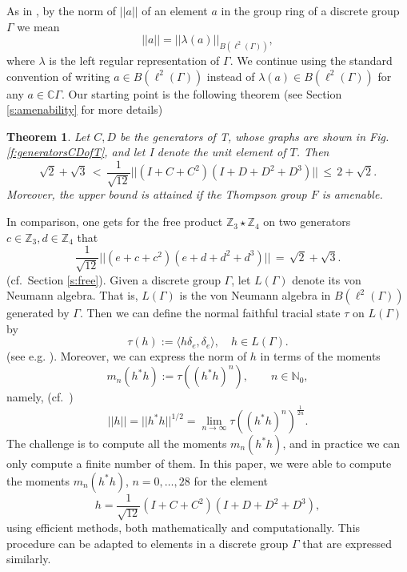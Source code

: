 \documentclass{amsart}
\newcommand{\C}{\mathbb C}
\newcommand{\N}{\mathbb N}
\newcommand{\Z}{\mathbb Z}
\newtheorem{thm}{Theorem}[section]
\theoremstyle{definition}
\begin{document}
As in \cite[Section 2]{HaagerupRamirezSolano},  by the norm of $||a||$  of an element $a$ in the group ring of a discrete group $\Gamma$ we mean
$$||a||=||\lambda(a)||_{B(\ell^2(\Gamma))},$$
where $\lambda$ is the left regular representation of $\Gamma$. We continue using the standard convention of writing  $a\in B(\ell^2(\Gamma))$ instead of $\lambda(a)\in B(\ell^2(\Gamma))$ for any $a\in \C \Gamma$.
Our starting point is the following theorem (see Section \ref{s:amenability} for more details) 
\begin{thm}Let $C,D$ be the generators of T, whose graphs are shown in Fig. \ref{f:generatorsCDofT}, and let I denote the unit element of $T$.  Then
$$\sqrt2+\sqrt3\,<\,\frac1{\sqrt{12}}||(I+C+C^2)(I+D+D^2+D^3)||\,\le\, 2+\sqrt2.$$
Moreover, the upper bound is attained if the Thompson group $F$ is amenable.
\end{thm}
In comparison, one gets for the free product $\Z_3\star\Z_4$ on two generators $c\in\Z_3, d\in\Z_4$ that
\begin{equation}\label{e:hfree}
\frac1{\sqrt{12}}||(e+c+c^2)(e+d+d^2+d^3)||\,=\,\sqrt2+\sqrt3.
\end{equation} 
(cf.~Section \ref{s:free}).
Given a discrete group $\Gamma$, let $L(\Gamma)$ denote its  von Neumann algebra. That is, $L(\Gamma)$ is the von Neumann algebra in $B(\ell^2(\Gamma))$ generated by $\Gamma$. Then we can define the normal faithful tracial state $\tau$ on $L(\Gamma)$ by
$$\tau(h):=\langle h\delta_e,\delta_e\rangle, \quad h\in L(\Gamma).$$
 (see e.g. \cite[Section 6.7]{KadRin}). 
 Moreover, we can express the norm of $h$ in terms of the moments
$$m_n(h^*h):=\tau((h^*h)^n),\qquad n\in\N_0,$$
 namely, (cf.~\cite[Section 4]{HaagerupRamirezSolano})
 $$||h||=||h^*h||^{1/2}=\lim_{n\to\infty}\tau((h^*h)^n)^{\frac1{2n}}.$$
 The challenge is to compute all the moments $m_n(h^*h)$, and in practice we can only compute a finite number of them.
In this paper, we were able to compute the moments $m_n(h^*h)$, $n=0,\ldots,28$ for the element 
$$h=\frac1{\sqrt{12}}(I+C+C^2)(I+D+D^2+D^3),$$
using efficient methods, both mathematically and computationally.
This procedure can be adapted to elements in a discrete group $\Gamma$ that are expressed similarly.
\end{document}
